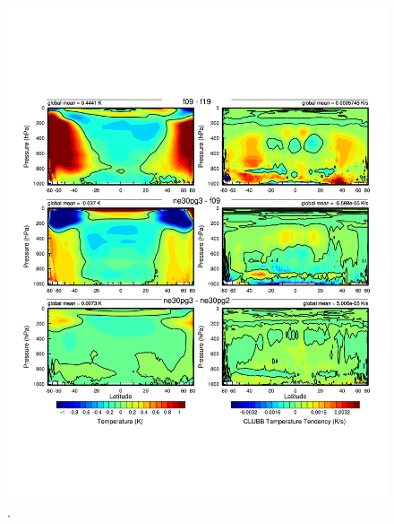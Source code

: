 \documentclass[draft]{agujournal2019}
\begin{document}
\begin{figure}[t]
\begin{center}
         \includegraphics[width=130mm]{figs/temp_dhgt_panel_STEND_CLUBB-lores.pdf}
\end{center}
\caption{.}
\label{fig:dT-lores}
\end{figure}
\end{document}
